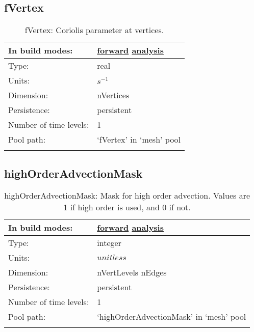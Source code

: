 \subsection[fVertex]{fVertex}
\label{subsec:var_sec_mesh_fVertex}
\begin{center}
\begin{longtable}{| p{2.0in} | p{4.0in} |}
        \hline 
        In build modes: & \hyperref[subsec:forward_var_tab_mesh]{forward} \hyperref[subsec:analysis_var_tab_mesh]{analysis} \\
        \hline 
        Type: & real \\
        \hline 
        Units: & $s^{-1}$ \\
        \hline 
        Dimension: & nVertices \\
        \hline 
        Persistence: & persistent \\
        \hline 
        Number of time levels: & 1 \\
        \hline 
            Pool path: & `fVertex' in `mesh' pool \\
		 \hline 
    \caption{fVertex: Coriolis parameter at vertices.}
\end{longtable}
\end{center}
\subsection[highOrderAdvectionMask]{highOrderAdvectionMask}
\label{subsec:var_sec_mesh_highOrderAdvectionMask}
\begin{center}
\begin{longtable}{| p{2.0in} | p{4.0in} |}
        \hline 
        In build modes: & \hyperref[subsec:forward_var_tab_mesh]{forward} \hyperref[subsec:analysis_var_tab_mesh]{analysis} \\
        \hline 
        Type: & integer \\
        \hline 
        Units: & $unitless$ \\
        \hline 
        Dimension: & nVertLevels nEdges \\
        \hline 
        Persistence: & persistent \\
        \hline 
        Number of time levels: & 1 \\
        \hline 
            Pool path: & `highOrderAdvectionMask' in `mesh' pool \\
		 \hline 
    \caption{highOrderAdvectionMask: Mask for high order advection. Values are 1 if high order is used, and 0 if not.}
\end{longtable}
\end{center}
